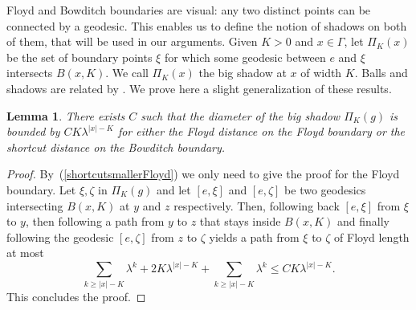 \documentclass{amsart}
\newcommand{\showcomments}{yes}
\newenvironment{comment}%
{\ifthenelse{\equal{\showcomments}{yes}}%
{\footnotemark
    \begin{lrbox}{\commentbox}
    \begin{minipage}[t]{1.25in}\raggedright\sffamily\upshape\tiny
    \footnotemark[\arabic{footnote}]}%
{\begin{lrbox}{\commentbox}}}%
{\ifthenelse{\equal{\showcomments}{yes}}%
{\end{minipage}\end{lrbox}\marginpar{\usebox{\commentbox}}}%
{\end{lrbox}}}
\newtheorem{lem}[thm]{Lemma}
\theoremstyle{definition}
\theoremstyle{remark}
\begin{document}

Floyd and Bowditch boundaries are visual: any two distinct points can be connected by a geodesic.  This enables us to define 
the notion of  shadows on both of them, that will be used in our arguments. 
Given $K>0$ and $x\in \Gamma$, let $\Pi_K(x)$ be the set of boundary points $\xi$ for which some geodesic between $e$ and $\xi$ intersects $B(x,K)$.
We call $\Pi_K(x)$ the big shadow at $x$ of width $K$. 
Balls and shadows are related by \cite[Lemmas~4.13, 4.14, 4.15]{PY}.
We prove here a slight generalization of these results.

\begin{lem}\label{diametershadow}
There exists $C$ such that the diameter of the big shadow $\Pi_K(g)$ is bounded by $CK\lambda^{|x|-K}$ for either the Floyd distance on the Floyd boundary or the shortcut distance on the Bowditch boundary.
\end{lem}

\begin{proof}
By~(\ref{shortcutsmallerFloyd}) we only need to give the proof for the Floyd boundary.
Let $\xi,\zeta$ in $\Pi_K(g)$ and let $[e,\xi]$ and $[e,\zeta]$ be two geodesics intersecting $B(x,K)$ at $y$ and $z$ respectively.
Then, following back $[e,\xi]$ from $\xi$ to $y$, then following a path from $y$ to $z$ that stays inside $B(x,K)$ and finally following the geodesic $[e,\zeta]$ from $z$ to $\zeta$ yields a path from $\xi$ to $\zeta$ of Floyd length at most
$$\sum_{k\geq |x|-K}\lambda^k+2K\lambda^{|x|-K}+\sum_{k\geq |x|-K}\lambda^k\leq CK\lambda^{|x|-K}.$$
This concludes the proof.
\end{proof}
\end{document}
